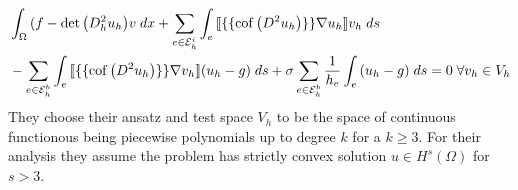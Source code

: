 \begin{align}
\begin{split}
	&\int_{\Omega} {{(f-\det{\left(D^2_h u_h\right)} v}\;dx} 
	+ \sum_{e \in \mathcal{E}_h^i} \int_{e} {{ \llbracket \{\{\operatorname{cof} \left( D^2 u_h \right) \}\} \nabla u_h\rrbracket v_h}\;ds} \\
	&- \sum_{e \in \mathcal{E}_h^b} \int_{e} {{ \llbracket \{\{\operatorname{cof} \left( D^2 u_h \right) \}\} \nabla v_h\rrbracket (u_h -g)}\;ds} 
	+ \sigma  \sum_{e \in \mathcal{E}_h^b} \frac 1 {h_e} \int_{e} {{ (u_h -g)}\;ds}  = 0 \; \forall v_h \in V_h \label{eq: brenner method}
\end{split}
\end{align}
They choose their ansatz and test space $V_h$ to be the space of continuous functionous being piecewise polynomials up to degree $k$ for a $k \geq 3$. For their analysis they assume the \MA problem has strictly convex solution $u\in H^s(\Omega)$ for $s>3$. %

